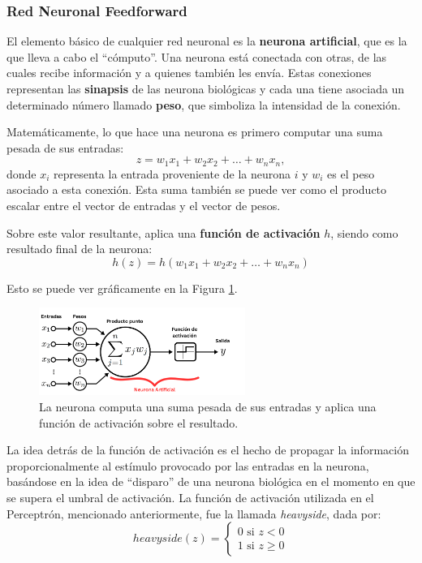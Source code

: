 \documentclass[../../main.tex]{subfiles}
\begin{document}
\subsubsection{Red Neuronal Feedforward}



El elemento básico de cualquier red neuronal es la \textbf{neurona artificial}, que es la que lleva a cabo el ``cómputo''. Una neurona está conectada con otras, de las cuales recibe información y a quienes también les envía. Estas conexiones representan las \textbf{sinapsis} de las neurona biológicas y cada una tiene asociada un determinado número llamado \textbf{peso}, que simboliza la intensidad de la conexión. 

Matemáticamente, lo que hace una neurona es primero computar una suma pesada de sus entradas:
\[z = w_1x_1 + w_2x_2 + \dots + w_nx_n,\]
donde \(x_i\) representa la entrada proveniente de la neurona \(i\) y \(w_i\) es el peso asociado a esta conexión. Esta suma también se puede ver como el producto escalar entre el vector de entradas y el vector de pesos.

Sobre este valor resultante, aplica una \textbf{función de activación} \(h\), siendo como resultado final de la neurona:
\[h(z) = h(w_1x_1 + w_2x_2 + \dots + w_nx_n)\]

Esto se puede ver gráficamente en la Figura \ref{fig:neuron}.

\begin{figure}[h!]
    \centering
    \includegraphics[width=0.6\textwidth]{figs/neurona.png}
    \caption{La neurona computa una suma pesada de sus entradas y aplica una función de activación sobre el resultado.}
    \label{fig:neuron}
\end{figure}

La idea detrás de la función de activación es el hecho de propagar la información proporcionalmente al estímulo provocado por las entradas en la neurona, basándose en la idea de ``disparo'' de una neurona biológica en el momento en que se supera el umbral de activación. La función de activación utilizada en el Perceptrón, mencionado anteriormente, fue la llamada \textit{heavyside}, dada por:
\[
    heavyside\left(z\right) =
        \begin{cases}  
            0\text{ si }z < 0 \\
            1\text{ si }z \geq 0
        \end{cases}
\] 
\end{document}
